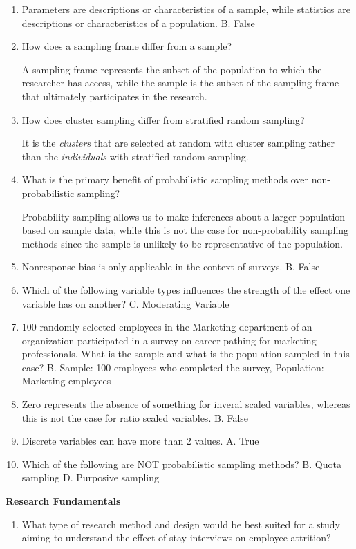 \documentclass[]{book}
\providecommand{\tightlist}{%
  \setlength{\itemsep}{0pt}\setlength{\parskip}{0pt}}
\begin{document}
\begin{enumerate}
\def\labelenumi{\arabic{enumi}.}
\item
  Parameters are descriptions or characteristics of a sample, while statistics are descriptions or characteristics of a population.
  B. False
\item
  How does a sampling frame differ from a sample?

  A sampling frame represents the subset of the population to which the researcher has access, while the sample is the subset of the sampling frame that ultimately participates in the research.
\item
  How does cluster sampling differ from stratified random sampling?

  It is the \emph{clusters} that are selected at random with cluster sampling rather than the \emph{individuals} with stratified random sampling.
\item
  What is the primary benefit of probabilistic sampling methods over non-probabilistic sampling?

  Probability sampling allows us to make inferences about a larger population based on sample data, while this is not the case for non-probability sampling methods since the sample is unlikely to be representative of the population.
\item
  Nonresponse bias is only applicable in the context of surveys.
  B. False
\item
  Which of the following variable types influences the strength of the effect one variable has on another?
  C. Moderating Variable
\item
  100 randomly selected employees in the Marketing department of an organization participated in a survey on career pathing for marketing professionals. What is the sample and what is the population sampled in this case?
  B. Sample: 100 employees who completed the survey, Population: Marketing employees
\item
  Zero represents the absence of something for inveral scaled variables, whereas this is not the case for ratio scaled variables.
  B. False
\item
  Discrete variables can have more than 2 values.
  A. True
\item
  Which of the following are NOT probabilistic sampling methods?
  B. Quota sampling
  D. Purposive sampling
\end{enumerate}

\textbf{Research Fundamentals}

\begin{enumerate}
\def\labelenumi{\arabic{enumi}.}
\tightlist
\item
  What type of research method and design would be best suited for a study aiming to understand the effect of stay interviews on employee attrition?
\end{enumerate}
\end{document}
